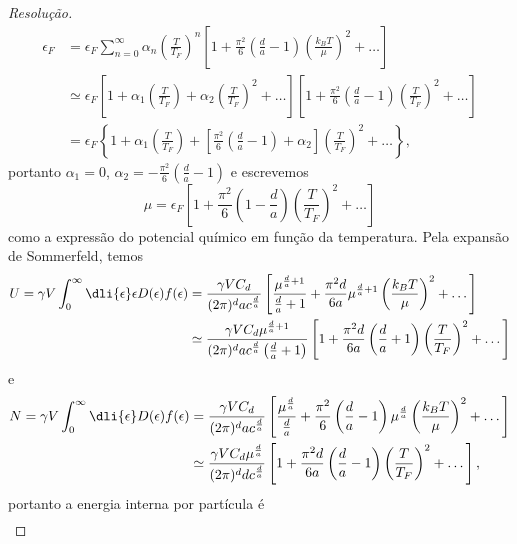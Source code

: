 \begin{proof}[Resolução]
    \begin{align*}
        \epsilon_F &= \epsilon_F\sum_{n = 0}^\infty \alpha_{n} \left(\frac{T}{T_F}\right)^{n}\left[1 + \frac{\pi^2}{6}\left(\frac{d}{a} - 1\right)\left(\frac{k_BT}{\mu}\right)^2 + \dots\right]\\
                   &\simeq \epsilon_F\left[1 + \alpha_1 \left(\frac{T}{T_F}\right) + \alpha_2 \left(\frac{T}{T_F}\right)^2 + \dots\right]\left[1 + \frac{\pi^2}{6}\left(\frac{d}{a} - 1\right)\left(\frac{T}{T_F}\right)^2 + \dots\right]\\
                   &= \epsilon_F\left\{1 + \alpha_1\left(\frac{T}{T_F}\right) + \left[\frac{\pi^2}{6}\left(\frac{d}{a} - 1\right) + \alpha_2\right]\left(\frac{T}{T_F}\right)^2 + \dots \right\},
    \end{align*}
    portanto \(\alpha_1 = 0\), \(\alpha_2 = - \frac{\pi^2}{6}\left(\frac{d}{a} - 1\right)\) e escrevemos
    \begin{equation*}
        \mu = \epsilon_F \left[1 + \frac{\pi^2}{6}\left(1 - \frac{d}{a}\right)\left(\frac{T}{T_F}\right)^2 + \dots\right]
    \end{equation*}
    como a expressão do potencial químico em função da temperatura. Pela expansão de Sommerfeld, temos
    \begin{align*}
        U = \gamma V\int_0^\infty \dli{\epsilon} \epsilon D(\epsilon) f(\epsilon)
        &= \frac{\gamma V C_d}{(2\pi)^d ac^{\frac{d}{a}}} \left[\frac{\mu^{\frac{d}{a} + 1}}{\frac{d}{a} + 1} + \frac{\pi^2d}{6a}\mu^{\frac{d}{a} + 1}\left(\frac{k_BT}{\mu}\right)^2 + \dots\right]\\
        &\simeq \frac{\gamma VC_d \mu^{\frac{d}{a} + 1}}{(2\pi)^d ac^{\frac{d}{a}}\left(\frac{d}{a} + 1\right)} \left[1 + \frac{\pi^2d}{6a}\left(\frac{d}{a} + 1\right)\left(\frac{T}{T_F}\right)^2 + \dots\right]
    \end{align*}
    e
    \begin{align*}
        N = \gamma V \int_0^\infty \dli{\epsilon} D(\epsilon) f(\epsilon)
        &= \frac{\gamma V C_d}{(2\pi)^d ac^{\frac{d}{a}}}\left[\frac{\mu^{\frac{d}{a}}}{\frac{d}{a}} + \frac{\pi^2}{6}\left(\frac{d}{a} - 1\right)\mu^{\frac{d}{a}}\left(\frac{k_B T}{\mu}\right)^2 + \dots\right]\\
        &\simeq \frac{\gamma V C_d \mu^{\frac{d}{a}}}{(2\pi)^d d c^{\frac{d}{a}}}\left[1 + \frac{\pi^2 d}{6a}\left(\frac{d}{a} - 1\right)\left(\frac{T}{T_F}\right)^2 + \dots\right],
    \end{align*}
    portanto a energia interna por partícula é
    \begin{align*}

\end{align*}
\end{proof}
